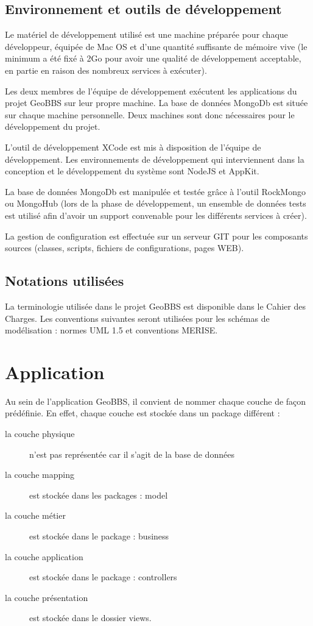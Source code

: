 \documentclass[a4paper,12pt]{report}
\begin{document}
\begin{onehalfspace}
\section{Environnement et outils de développement}
  Le matériel de développement utilisé est une machine préparée pour chaque développeur, équipée de  Mac OS et d’une quantité suffisante de mémoire vive (le minimum a été fixé à 2Go pour avoir une qualité de développement acceptable, en partie en raison des nombreux services à exécuter).

  Les deux membres de l’équipe de développement exécutent les applications du projet GeoBBS sur leur propre machine. La base de données MongoDb est située sur chaque machine personnelle. Deux machines sont donc nécessaires pour le développement du projet.

  L’outil de développement XCode est mis à disposition de l’équipe de développement. Les environnements de développement qui interviennent dans la conception et le développement du système sont NodeJS et AppKit.

  La base de données MongoDb est manipulée et testée grâce à l’outil RockMongo ou MongoHub (lors de la phase de développement, un ensemble de données tests est utilisé afin d’avoir un support convenable pour les différents services à créer).

  La gestion de configuration est effectuée sur un serveur GIT pour les composants sources (classes, scripts, fichiers de configurations, pages WEB).

\section{Notations utilisées}
  La terminologie utilisée dans le projet GeoBBS est disponible dans le Cahier des Charges. Les conventions suivantes seront utilisées pour les schémas de modélisation : normes UML 1.5 et conventions MERISE.

\chapter{Application}
Au sein de l’application GeoBBS, il convient de nommer chaque couche de façon prédéfinie. En effet, chaque couche est stockée dans un package différent :
\begin{description}
\item[la couche physique] n’est pas représentée car il s’agit de la base de données
\item[la couche mapping] est stockée dans les packages : model
\item[la couche métier] est stockée dans le package : business
\item[la couche application] est stockée dans le package : controllers
\item[la couche présentation] est stockée dans le dossier views.
\end{description}


\end{onehalfspace}
\end{document}
